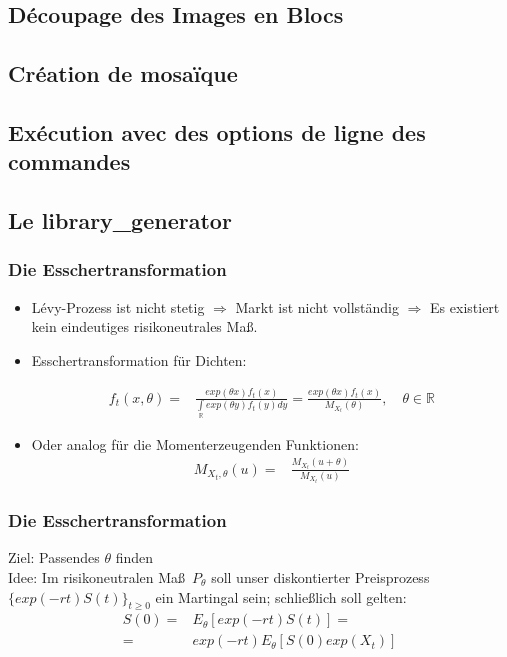 \documentclass[handout]{beamer}
\newcommand{\tcb}{\color{blue}}
\begin{document}
\subsection{D\'ecoupage des Images en Blocs}
\subsection{Cr\'eation de mosa\"ique}
\subsection{Ex\'ecution avec des options de ligne des commandes}
\subsection{Le library\_generator}
\begin{frame}
\frametitle{\bf Die Esschertransformation}
\begin{itemize}
\item L\'evy-Prozess ist nicht stetig $\Rightarrow$ Markt ist nicht vollst\"andig
$\Rightarrow$ Es existiert kein eindeutiges risikoneutrales Ma\ss.\\

\item Esschertransformation f\"ur Dichten:

\begin{align*}
f_t(x,\theta)=&\frac{exp(\theta x)f_t(x)}{\int\limits_{\mathbb{R}}exp(\theta y)f_t(y)dy}=\frac{exp(\theta x)f_t(x)}{M_{X_t}(\theta)}, \quad \theta\in\mathbb{R}
\end{align*}
\item Oder analog f\"ur die Momenterzeugenden Funktionen:
\begin{align*}
M_{X_t,\theta}(u)=&\frac{M_{X_t}(u+\theta)}{M_{X_t}(u)}
\end{align*}
\end{itemize}
\end{frame}

\begin{frame}
\frametitle{\bf Die Esschertransformation}
{\tcb Ziel:} Passendes $\theta$ finden\\ \pause
{\tcb Idee:} Im risikoneutralen Ma\ss \ $P_\theta$ soll unser diskontierter Preisprozess $\{exp(-rt)S(t)\}_{t\ge0}$ ein Martingal sein; schlie\ss lich soll gelten:
\begin{align*}
S(0)=&E_\theta[exp(-rt)S(t)]= \\
=&exp(-rt)E_\theta[S(0)exp(X_t)]
\end{align*}
\end{frame}
\end{document}
